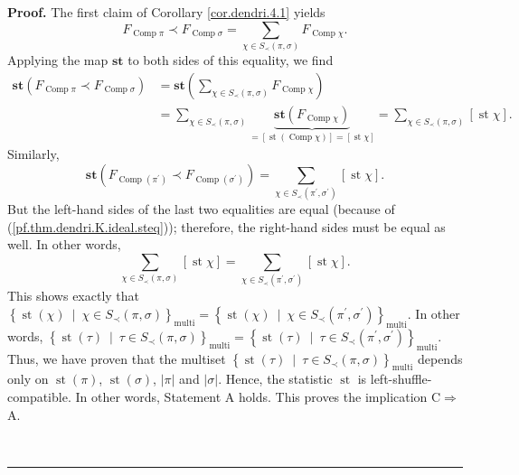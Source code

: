\documentclass[numbers=enddot,12pt,final,onecolumn,notitlepage]{scrartcl}%
\theoremstyle{definition}
\newenvironment{proof}[1][Proof]{\noindent\textbf{#1.} }{\ \rule{0.5em}{0.5em}}
\newenvironment{verlong}{}{}
\let\sumnonlimits\sum
\renewcommand{\sum}{\sumnonlimits\limits}
\begin{document}
\begin{verlong}
\begin{proof}
The first claim of Corollary \ref{cor.dendri.4.1} yields%
\[
F_{\operatorname*{Comp}\pi}\left.  \prec\right.  F_{\operatorname*{Comp}%
\sigma}=\sum_{\chi\in S_{\prec}\left(  \pi,\sigma\right)  }%
F_{\operatorname*{Comp}\chi}.
\]
Applying the map $\mathbf{st}$ to both sides of this equality, we find%
\begin{align*}
\mathbf{st}\left(  F_{\operatorname*{Comp}\pi}\left.  \prec\right.
F_{\operatorname*{Comp}\sigma}\right)   &  =\mathbf{st}\left(  \sum_{\chi\in
S_{\prec}\left(  \pi,\sigma\right)  }F_{\operatorname*{Comp}\chi}\right) \\
&  =\sum_{\chi\in S_{\prec}\left(  \pi,\sigma\right)  }\underbrace{\mathbf{st}%
\left(  F_{\operatorname*{Comp}\chi}\right)  }_{=\left[  \operatorname*{st}%
\left(  \operatorname*{Comp}\chi\right)  \right]  =\left[  \operatorname*{st}%
\chi\right]  }=\sum_{\chi\in S_{\prec}\left(  \pi,\sigma\right)  }\left[
\operatorname*{st}\chi\right]  .
\end{align*}
Similarly,%
\[
\mathbf{st}\left(  F_{\operatorname*{Comp}\left(  \pi^{\prime}\right)
}\left.  \prec\right.  F_{\operatorname*{Comp}\left(  \sigma^{\prime}\right)
}\right)  =\sum_{\chi\in S_{\prec}\left(  \pi^{\prime},\sigma^{\prime}\right)
}\left[  \operatorname*{st}\chi\right]  .
\]
But the left-hand sides of the last two equalities are equal (because of
(\ref{pf.thm.dendri.K.ideal.steq})); therefore, the right-hand sides must be
equal as well. In other words,
\[
\sum_{\chi\in S_{\prec}\left(  \pi,\sigma\right)  }\left[  \operatorname*{st}%
\chi\right]  =\sum_{\chi\in S_{\prec}\left(  \pi^{\prime},\sigma^{\prime
}\right)  }\left[  \operatorname*{st}\chi\right]  .
\]
This shows exactly that $\left\{  \operatorname*{st}\left(  \chi\right)
\ \mid\ \chi\in S_{\prec}\left(  \pi,\sigma\right)  \right\}
_{\operatorname*{multi}} =\left\{  \operatorname*{st}\left(  \chi\right)
\ \mid\ \chi\in S_{\prec}\left(  \pi^{\prime},\sigma^{\prime}\right)
\right\}  _{\operatorname*{multi}} $. In other words, $\left\{
\operatorname*{st}\left(  \tau\right)  \ \mid\ \tau\in S_{\prec}\left(
\pi,\sigma\right)  \right\}  _{\operatorname*{multi}} =\left\{
\operatorname*{st}\left(  \tau\right)  \ \mid\ \tau\in S_{\prec}\left(
\pi^{\prime},\sigma^{\prime}\right)  \right\}  _{\operatorname*{multi}} $.
Thus, we have proven that the multiset $\left\{  \operatorname*{st}\left(
\tau\right)  \ \mid\ \tau\in S_{\prec}\left(  \pi,\sigma\right)  \right\}
_{\operatorname*{multi}} $ depends only on $\operatorname*{st}\left(
\pi\right)  $, $\operatorname*{st}\left(  \sigma\right)  $, $\left\vert
\pi\right\vert $ and $\left\vert \sigma\right\vert $. Hence, the statistic
$\operatorname*{st}$ is left-shuffle-compatible. In other words, Statement A
holds. This proves the implication C$\Longrightarrow$A.


\end{proof}
\end{verlong}
\end{document}
